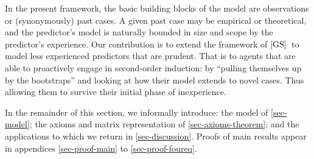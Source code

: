 \documentclass[12pt,a4paper,twoside]{article}
\newcommand{\gsii}{$\textup{[GS]}$}
\begin{document}
In the present framework, the basic building blocks of the model are
observations or (synonymously) past cases. A given past case may be empirical or
theoretical, and the predictor's model is naturally bounded in size and scope by
the predictor's experience. Our contribution is to extend the framework of
\gsii\ to model less experienced predictors that are prudent. That is to agents
that are able to proactively engage in second-order induction: by ``pulling
themselves up by the bootstraps'' and looking at how their model extends to
novel cases. Thus allowing them to survive their initial phase of inexperience.

In the remainder of this section, we informally introduce: the model of
\cref{sec-model}; the axioms and matrix representation of
\cref{sec-axioms-theorem}; and the applications to which we return in
\cref{sec-discussion}. Proofs of main results appear in appendices
\ref{sec-proof-main} to \ref{sec-proof-foureq}.
\end{document}
